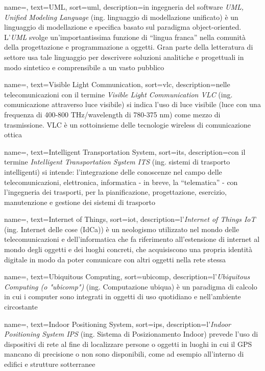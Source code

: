  {
    name=,
    text=UML,
    sort=uml,
    description={in ingegneria del software \emph{UML, Unified Modeling Language} (ing. linguaggio di modellazione unificato) è un linguaggio di modellazione e specifica basato sul paradigma object-oriented. L'\emph{UML} svolge un'importantissima funzione di ``lingua franca'' nella comunità della progettazione e programmazione a oggetti. Gran parte della letteratura di settore usa tale linguaggio per descrivere soluzioni analitiche e progettuali in modo sintetico e comprensibile a un vasto pubblico}
}

 {
    name=,
    text=Visible Light Communication,
    sort=vlc,
    description={nelle telecomunicazioni con il termine \emph{Visible Light Communication VLC} (ing. comunicazione attraverso luce visibile) si indica l'uso di luce visibile (luce con una frequenza di 400-800 THz/wavelength di 780-375 nm) come mezzo di trasmissione. VLC è un sottoinsieme delle tecnologie wireless di comunicazione ottica}
}

 {
    name=,
    text=Intelligent Transportation System,
    sort=its,
    description={con il termine \emph{Intelligent Transportation System ITS} (ing. sistemi di trasporto intelligenti) si intende: l'integrazione delle conoscenze nel campo delle telecomunicazioni, elettronica, informatica - in breve, la “telematica” - con l'ingegneria dei trasporti, per la pianificazione, progettazione, esercizio, manutenzione e gestione dei sistemi di trasporto}
}

 {
    name=,
    text=Internet of Things,
    sort=iot,
    description={l'\emph{Internet of Things IoT} (ing. Internet delle cose (IdCa)) è un neologismo utilizzato nel mondo delle telecomunicazioni e dell'informatica che fa riferimento all'estensione di internet al mondo degli oggetti e dei luoghi concreti, che acquisiscono una propria identità digitale in modo da poter comunicare con altri oggetti nella rete stessa}
}

 {
    name=,
    text=Ubiquitous Computing,
    sort=ubicomp,
    description={l'\emph{Ubiquitous Computing (o "ubicomp")} (ing. Computazione ubiqua) è un paradigma di calcolo in cui i computer sono integrati in oggetti di uso quotidiano e nell'ambiente circostante}
}

 {
    name=,
    text=Indoor Positioning System,
    sort=ips,
    description={l'\emph{Indoor Positioning System IPS} (ing. Sistema di Posizionamento Indoor) prevede l'uso di dispositivi di rete al fine di localizzare persone o oggetti in luoghi in cui il GPS mancano di precisione o non sono disponibili, come ad esempio all'interno di edifici e strutture sotterranee}
}


